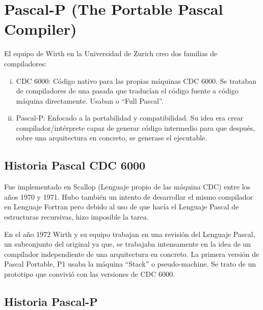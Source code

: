 \section{Pascal-P (The Portable Pascal Compiler)}

El equipo de Wirth en la Universidad de Zurich creo dos familias de 
compiladores:

\begin{enumerate}[i.]

\item {}CDC 6000: Código nativo para las propias máquinas CDC 6000. Se trataban de 
compiladores de una pasada que traducían el código fuente a código máquina 
directamente. Usaban  o ``Full Pascal''.

\item {}Pascal-P: Enfocado a la portabilidad y compatibilidad. Su idea era crear 
compilador/intérprete capaz de generar código intermedio para que después, 
sobre una arquitectura en concreto, se generase el ejecutable.

\end{enumerate}



\subsection{Historia Pascal CDC 6000}

%

Fue implementado en Scallop (Lenguaje propio de las máquina CDC) entre los 
años 1970 y 1971. Hubo también un intento de desarrollar el mismo compilador en 
Lenguaje Fortran pero debido al uso de que hacía el Lenguaje Pascal de 
estructuras recursivas, hizo imposible la tarea.

En el año 1972 Wirth y su equipo trabajan en una revisión del Lenguaje Pascal, 
un subconjunto del original ya que, se trabajaba intensamente en la idea de un 
compilador independiente de una arquitectura en concreto. La primera versión de 
Pascal Portable, P1 usaba la máquina ``Stack'' o pseudo-machine. Se trato de un 
prototipo que convivió con las versiones de CDC 6000.

%

\subsection{Historia Pascal-P}

